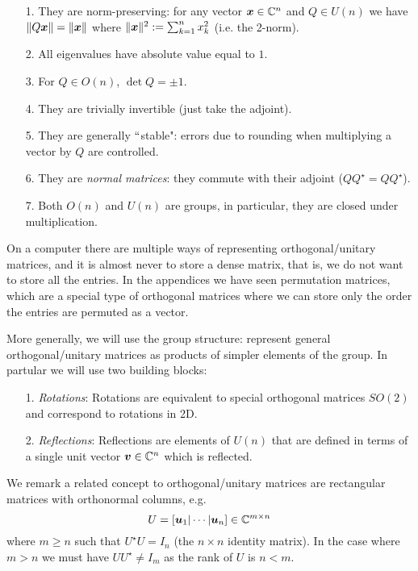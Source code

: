 \begin{itemize}
\item[1. ] They are norm-preserving: for any vector $\bm{{\mbox{\boldmath$x$\unboldmath}}} \in {\mathbb C}^n$ and $Q \ensuremath{\in} U(n)$    we have $\|Q \bm{{\mbox{\boldmath$x$\unboldmath}}} \| = \| \bm{{\mbox{\boldmath$x$\unboldmath}}}\|$ where $\| \bm{{\mbox{\boldmath$x$\unboldmath}}} \|^2 := \sum_{k=1}^n x_k^2$ (i.e. the 2-norm).


\item[2. ] All eigenvalues have absolute value equal to $1$.


\item[3. ] For $Q \ensuremath{\in} O(n)$,  $\det Q = \ensuremath{\pm}1$.


\item[4. ] They are trivially invertible (just take the adjoint).


\item[5. ] They are generally \ensuremath{\ldq}stable": errors due to rounding when multiplying a vector by $Q$ are controlled.


\item[6. ] They are \emph{normal matrices}: they commute with their adjoint ($Q Q^\ensuremath{\star} = Q Q^\ensuremath{\star}$). 


\item[7. ] Both $O(n)$ and $U(n)$ are groups, in particular, they are closed under multiplication.

\end{itemize}
On a computer there are multiple ways of representing orthogonal/unitary matrices, and it is almost never to store a dense matrix, that is, we do not want to store all the entries. In the appendices we have seen permutation matrices, which are a special type of orthogonal matrices where we can store only the order the entries are permuted as a vector. 

More generally, we will use the group structure: represent general orthogonal/unitary matrices as products of simpler elements of the group. In partular we will use two building blocks:

\begin{itemize}
\item[1. ] \emph{Rotations}: Rotations are equivalent to special orthogonal matrices $SO(2)$  and correspond to rotations in 2D.


\item[2. ] \emph{Reflections}:  Reflections are elements of $U(n)$ that are defined in terms of a single unit vector $\bm{{\mbox{\boldmath$v$\unboldmath}}} \in {\mathbb C}^n$ which is reflected.

\end{itemize}
We remark a related concept to orthogonal/unitary matrices are rectangular matrices with orthonormal columns, e.g.
\[
U = [\bm{{\mbox{\boldmath$u$\unboldmath}}}_1 | \cdots | \bm{{\mbox{\boldmath$u$\unboldmath}}}_n] \in {\mathbb C}^{m \times n}
\]
where $m \ensuremath{\geq} n$ such that $U^\ensuremath{\star} U =  I_n$ (the $n \ensuremath{\times} n$ identity matrix). In the case where $m > n$ we must have $UU^\ensuremath{\star} \ensuremath{\neq} I_m$ as the rank of $U$ is $n < m$. 

